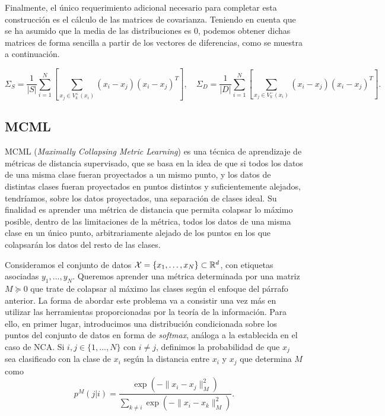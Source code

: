 \documentclass{book}
\begin{document}
Finalmente, el único requerimiento adicional necesario para completar esta construcción es el cálculo de las matrices de covarianza. Teniendo en cuenta que se ha asumido que la media de las distribuciones es 0, podemos obtener dichas matrices de forma sencilla a partir de los vectores de diferencias, como se muestra a continuación.

\begin{equation*}
	\Sigma_S = \frac{1}{|S|}\sum_{i=1}^{N} \left[ \sum_{x_j \in V_k^+(x_i)} (x_i-x_j)(x_i-x_j)^T\right], \quad \Sigma_D = \frac{1}{|D|}\sum_{i=1}^{N} \left[ \sum_{x_j \in V_k^-(x_i)} (x_i-x_j)(x_i-x_j)^T\right].
\end{equation*}


\subsection{MCML}

MCML (\emph{Maximally Collapsing Metric Learning}) \cite{mcml} es una técnica de aprendizaje de métricas de distancia supervisado, que se basa en la idea de que si todos los datos de una misma clase fueran proyectados a un mismo punto, y los datos de distintas clases fueran proyectados en puntos distintos y suficientemente alejados, tendríamos, sobre los datos proyectados, una separación de clases ideal.  Su finalidad es aprender una métrica de distancia que permita colapsar lo máximo posible, dentro de las limitaciones de la métrica, todos los datos de una misma clase en un único punto, arbitrariamente alejado de los puntos en los que colapsarán los datos del resto de las clases.

Consideramos el conjunto de datos $\mathcal{X} = \{x_1,\dots,x_N\} \subset \mathbb{R}^d$, con etiquetas asociadas $y_1,\dots,y_N$. Queremos aprender una métrica determinada por una matriz $M \succeq 0$ que trate de colapsar al máximo las clases según el enfoque del párrafo anterior. La forma de abordar este problema va a consistir una vez más en utilizar las herramientas proporcionadas por la teoría de la información. Para ello, en primer lugar, introducimos una distribución condicionada sobre los puntos del conjunto de datos en forma de \emph{softmax}, análoga a la establecida en el caso de NCA. Si $i,j \in \{1,\dots,N\}$ con $i \ne j$, definimos la probabilidad de que $x_j$ sea clasificado con la clase de $x_i$ según la distancia entre $x_i$ y $x_j$ que determina $M$ como
\begin{equation}
	p^{M}(j|i) = \frac{\exp(-\|x_i-x_j\|^2_M)}{\sum\limits_{k\ne i} \exp(-\|x_i-x_k\|^2_M)}.
\end{equation}
\end{document}
